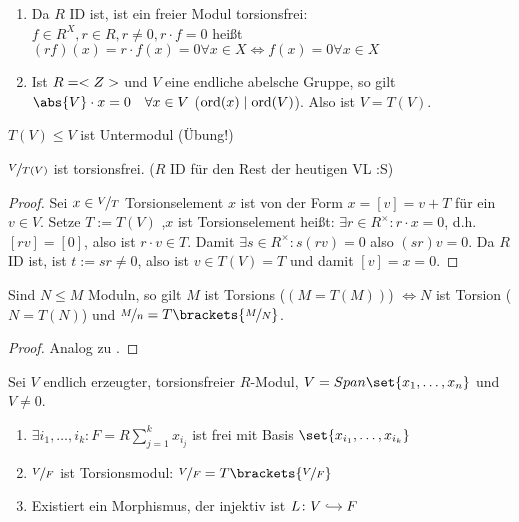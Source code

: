 \begin{example}
	\begin{enumerate}
		\item Da $R$ ID ist, ist ein freier Modul torsionsfrei:\\
		$f \in R^X, r \in R, r \neq 0, r \cdot f = 0$ heißt $(rf)(x) = r \cdot f(x) = 0 \forall x \in X \Leftrightarrow f(x) = 0 \forall x \in X$
		\item Ist $R = <Z>$ und $V$ eine endliche abelsche Gruppe, so gilt $\abs{V}\cdot x = 0\quad \forall x \in V$ ($\operatorname{ord}(x) \mid \operatorname{ord}(V)$). Also ist $V = T(V)$.
	\end{enumerate}
\end{example}
\begin{*remark}
	$T(V) \le V$ ist Untermodul (Übung!)
\end{*remark}
\begin{lemma}
	$\lnkset{V}{T(V)}$ ist torsionsfrei. ($R$ ID für den Rest der heutigen VL :S)
\end{lemma}
\begin{proof}
	Sei $x \in \lnkset{V}{T}$ Torsionselement $x$ ist von der Form $x = [v] = v + T$ für ein $v\in V$. Setze $T := T(V)$ ,$x$ ist Torsionselement heißt: $\exists r \in R^{\times}\colon r \cdot x = 0$, d.h. $[rv] = [0]$, also ist $r \cdot v \in T$. Damit $\exists s \in R^{\times}\colon s(rv) = 0$ also $(sr)v = 0$. Da $R$ ID ist, ist $t:= sr \neq 0$, also ist $v \in T(V) = T$ und damit $[v] = x = 0$.
\end{proof}
\begin{lemma}
	Sind $N \le M$ Moduln, so gilt $M$ ist Torsions ($(M = T(M))$) $\Leftrightarrow N$ ist Torsion ($N = T(N)$) und $\lnkset{M}{n} = T\brackets{\lnkset{M}{N}}$.
\end{lemma}
\begin{proof}
	Analog zu .
\end{proof}
\begin{proposition}
	Sei $V$ endlich erzeugter, torsionsfreier $R$-Modul, $V = Span\set{x_1, \dots, x_n}$ und $V \neq 0$.
	\begin{enumerate}
		\item $\exists i_1, \dots, i_k \colon F = R\sum_{j=1}^k x_{i_j}$ ist frei mit Basis $\set{x_{i_1}, \dots, x_{i_k}}$
		\item $\lnkset{V}{F}$ ist Torsionsmodul: $\lnkset{V}{F} = T\brackets{\lnkset{V}{F}}$
		\item Existiert ein Morphismus, der injektiv ist $L \colon \begin{tikzcd}[cramped, sep=small]
		V \arrow[r, hook] & F
		\end{tikzcd}$
	\end{enumerate}
\end{proposition}

